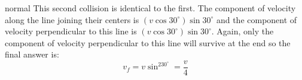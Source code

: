 \begin{solution}{normal}
This second collision is identical to the first. The component of velocity along the line joining their centers is $(v\cos 30^\circ)\sin 30^\circ$ and the component of velocity perpendicular to this line is $(v\cos 30^\circ)\sin 30^\circ$. Again, only the component of velocity perpendicular to this line will survive at the end so the final answer is:
$$\boxed{v_f=v\sin^230^\circ=\frac{v}{4}}$$
\end{solution}
